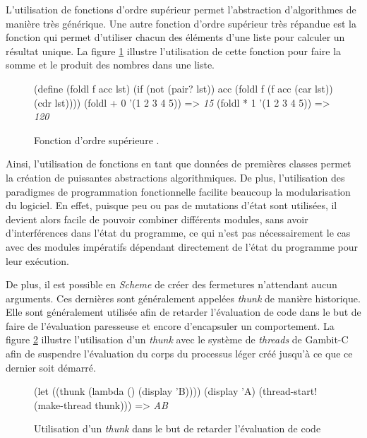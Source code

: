 \documentclass[12pt,twoside,letterpaper,francais]{book}
\newcommand{\Schemelang}{{\textit{Scheme }}}
\newcommand{\scheme}[1]{\selectlanguage{english}{\tt #1}\selectlanguage{french}}
\newcommand{\schemeresult}[1]{{\it #1}}
\begin{document}
L'utilisation de fonctions d'ordre supérieur permet l'abstraction
d'algorithmes de manière très générique. Une autre fonction d'ordre
supérieur très répandue est la fonction \scheme{foldl} qui permet
d'utiliser chacun des éléments d'une liste pour calculer un résultat
unique. La figure \ref{Scheme:fold} illustre l'utilisation de cette
fonction pour faire la somme et le produit des nombres dans une
liste.

\begin{figure}[htb!]
  \begin{schemecode}
(define (foldl f acc lst)
    (if (not (pair? lst))
        acc
        (foldl f (f acc (car lst)) (cdr lst))))
(foldl + 0 '(1 2 3 4 5)) => \schemeresult{15}
(foldl * 1 '(1 2 3 4 5)) => \schemeresult{120}
  \end{schemecode}
  \caption{Fonction d'ordre supérieure \scheme{foldl}.}
  \label{Scheme:fold}
\end{figure}

Ainsi, l'utilisation de fonctions en tant que données de premières
classes permet la création de puissantes abstractions
algorithmiques. De plus, l'utilisation des paradigmes de programmation
fonctionnelle facilite beaucoup la modularisation du logiciel. En
effet, puisque peu ou pas de mutations d'état sont utilisées, il
devient alors facile de pouvoir combiner différents modules, sans
avoir d'interférences dans l'état du programme, ce qui n'est pas
nécessairement le cas avec des modules impératifs dépendant
directement de l'état du programme pour leur exécution.

De plus, il est possible en \Schemelang de créer des fermetures n'attendant
aucun arguments. Ces dernières sont généralement appelées
\textit{thunk} de manière historique. Elle sont généralement utilisée
afin de retarder l'évaluation de code dans le but de faire de
l'évaluation paresseuse et encore d'encapsuler un comportement. La
figure \ref{Scheme:thunk} illustre l'utilisation d'un \textit{thunk}
avec le système de \textit{threads} de Gambit-C afin de suspendre
l'évaluation du corps du processus léger créé jusqu'à ce que ce dernier soit démarré.

\begin{figure}[htb!]
  \begin{schemecode}
(let ((thunk (lambda () (display 'B))))
  (display 'A)
  (thread-start! (make-thread thunk))) => \schemeresult{AB}
  \end{schemecode}
  \caption{Utilisation d'un \textit{thunk} dans le but de retarder
    l'évaluation de code}
  \label{Scheme:thunk}
\end{figure}
\end{document}
